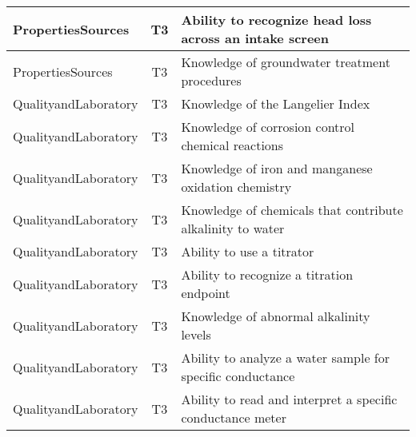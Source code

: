 \documentclass{article}
\begin{document}
\begin{table}[]
\begin{tabular}{|l|c|l|}
PropertiesSources                      & T3             & Ability to recognize   head loss across an intake screen                                                                          \\ \hline
PropertiesSources                      & T3             & Knowledge of   groundwater treatment procedures                                                                                   \\ \hline
QualityandLaboratory                   & T3             & Knowledge of the   Langelier Index                                                                                                \\ \hline
QualityandLaboratory                   & T3             & Knowledge of   corrosion control chemical reactions                                                                               \\ \hline
QualityandLaboratory                   & T3             & Knowledge of iron and   manganese oxidation chemistry                                                                             \\ \hline
QualityandLaboratory                   & T3             & Knowledge of   chemicals that contribute alkalinity to water                                                                      \\ \hline
QualityandLaboratory                   & T3             & Ability to use a   titrator                                                                                                       \\ \hline
QualityandLaboratory                   & T3             & Ability to recognize   a titration endpoint                                                                                       \\ \hline
QualityandLaboratory                   & T3             & Knowledge of abnormal   alkalinity levels                                                                                         \\ \hline
QualityandLaboratory                   & T3             & Ability to analyze a   water sample for specific conductance                                                                      \\ \hline
QualityandLaboratory                   & T3             & Ability to read and   interpret a specific conductance meter                                                                      \\ \hline

\end{tabular}
\end{table}
\end{document}
